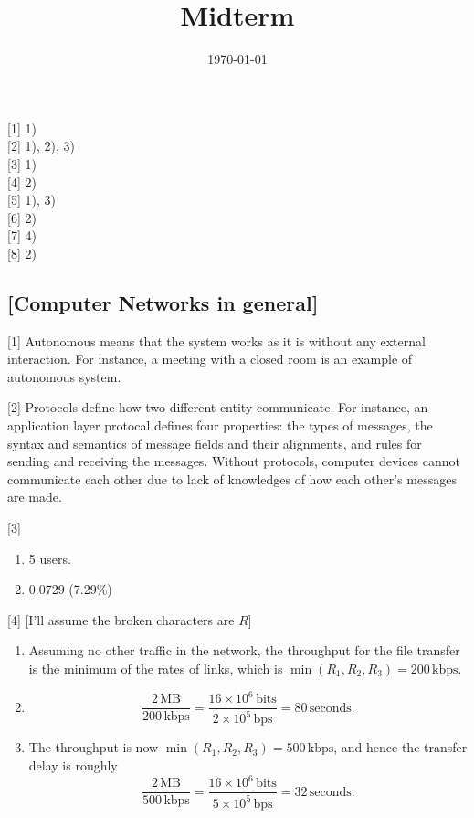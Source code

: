 \documentclass{homework}
\title{Midterm}
\date{\today}
\begin{document}
\maketitle

\parindent=0pt

{[1]} 1) \\
{[2]} 1), 2), 3) \\
{[3]} 1) \\
{[4]} 2) \\
{[5]} 1), 3) \\
{[6]} 2) \\
{[7]} 4) \\
{[8]} 2)


\subsection*{[Computer Networks in general]}

[1] Autonomous means that the system works as it is without any external interaction. For instance, a meeting with a closed room is an example of autonomous system.

[2] Protocols define how two different entity communicate. For instance, an application layer protocal defines four properties: the types of messages, the syntax and semantics of message fields and their alignments, and rules for sending and receiving the messages. Without protocols, computer devices cannot communicate each other due to lack of knowledges of how each other's messages are made.

[3] \begin{enumerate}[label={\arabic*)}]
    \item 5 users.
    \item 0.0729 (7.29\%)
\end{enumerate}

[4] [I'll assume the broken characters are $R$]
\begin{enumerate}[label={\arabic*)}]
    \item Assuming no other traffic in the network, the throughput for the file transfer is the minimum of the rates of links, which is $\min(R_1, R_2, R_3) = 200\,\text{kbps}$.
    \item $$\frac{2\,\text{MB}}{200\,\text{kbps}} = \frac{16\times 10^6 \,\text{bits}}{2\times 10^5\,\text{bps}} = 80\,\text{seconds}.$$
    \item The throughput is now $\min(R_1, R_2, R_3) = 500\,\text{kbps}$, and hence the transfer delay is roughly
    $$\frac{2\,\text{MB}}{500\,\text{kbps}} = \frac{16\times 10^6 \,\text{bits}}{5\times 10^5\,\text{bps}} = 32\,\text{seconds}.$$
\end{enumerate}
\end{document}
